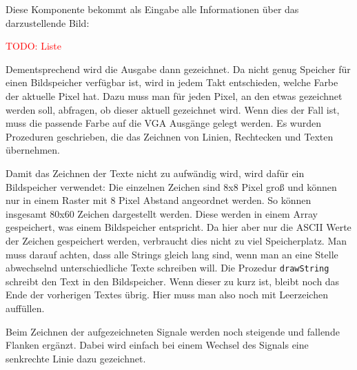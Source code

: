 \documentclass[IN,ngerman,utf8,12pt]{tumbook}
\newcommand\todo[1]{\textcolor{red}{TODO: #1}}
\begin{document}
Diese Komponente bekommt als Eingabe alle Informationen über das darzustellende Bild:

\todo{Liste}

Dementsprechend wird die Ausgabe dann gezeichnet.
Da nicht genug Speicher für einen Bildspeicher verfügbar ist, wird in jedem Takt entschieden, welche Farbe der aktuelle Pixel hat.
Dazu muss man für jeden Pixel, an den etwas gezeichnet werden soll, abfragen, ob dieser aktuell gezeichnet wird.
Wenn dies der Fall ist, muss die passende Farbe auf die VGA Ausgänge gelegt werden.
Es wurden Prozeduren geschrieben, die das Zeichnen von Linien, Rechtecken und Texten übernehmen.

Damit das Zeichnen der Texte nicht zu aufwändig wird, wird dafür ein Bildspeicher verwendet:
Die einzelnen Zeichen sind 8x8 Pixel groß und können nur in einem Raster mit 8 Pixel Abstand angeordnet werden.
So können insgesamt 80x60 Zeichen dargestellt werden.
Diese werden in einem Array gespeichert, was einem Bildspeicher entspricht.
Da hier aber nur die ASCII Werte der Zeichen gespeichert werden, verbraucht dies nicht zu viel Speicherplatz.
Man muss darauf achten, dass alle Strings gleich lang sind, wenn man an eine Stelle abwechselnd unterschiedliche Texte schreiben will.
Die Prozedur \texttt{drawString} schreibt den Text in den Bildspeicher.
Wenn dieser zu kurz ist, bleibt noch das Ende der vorherigen Textes übrig.
Hier muss man also noch mit Leerzeichen auffüllen.

Beim Zeichnen der aufgezeichneten Signale werden noch steigende und fallende Flanken ergänzt.
Dabei wird einfach bei einem Wechsel des Signals eine senkrechte Linie dazu gezeichnet.
\end{document}
